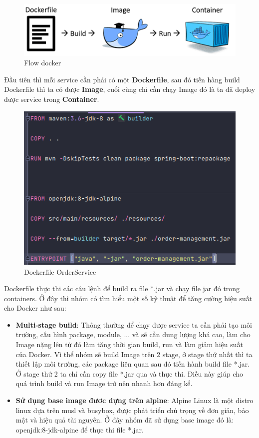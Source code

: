 		  
		  \begin{figure}[H]
		  	\centering
		  	\includegraphics[width=0.8\linewidth]{Images/flowDocker}
		  	\linebreak
		  	\caption{Flow docker}
		  \end{figure}
		  
		  Đầu tiên thì mỗi service cần phải có một \textbf{Dockerfile}, sau đó tiến hàng build Dockerfile thì ta có được \textbf{Image}, cuối cùng chỉ cần chạy Image đó là ta đã deploy được service trong \textbf{Container}.
		  
		  \begin{figure}[H]
		  	\centering
		  	\includegraphics[width=0.7\linewidth]{Images/DockerfileOrderService}
		  	\linebreak
		  	\caption{Dockerfile OrderService}
		  \end{figure}
		  
		  Dockerfile thực thi các câu lệnh để build ra file *.jar và chạy file jar đó trong containers. Ở đây thì nhóm có tìm hiểu một số kỹ thuật để tăng cường hiệu suất cho Docker như sau:
		  
		  \begin{itemize}
		  	\item \textbf{Multi-stage build}: Thông thường để chạy được service ta cần phải tạo môi trường, cấu hình package, module, ... và sẽ cần dung lượng khá cao, làm cho Image nặng lên từ đó làm tăng thời gian build, run và làm giảm hiệu suất của Docker. Vì thể nhóm sẽ build Image trên 2 stage, ở stage thứ nhất thì ta thiết lập môi trường, các package liên quan sau đó tiến hành build file *.jar. Ở stage thứ 2 ta chỉ cần copy file *.jar qua và thực thi. Điều này giúp cho quá trình build và run Image trở nên nhanh hơn đáng kể.
		  	\item \textbf{Sử dụng base image đươc dựng trên alpine}: Alpine Linux là một distro linux dựa trên musl và busybox, được phát triển chú trọng về đơn giản, bảo mật và hiệu quả tài nguyên. Ở đây nhóm đã sử dụng base image đó là: openjdk:8-jdk-alpine để thực thi file *.jar.
		  \end{itemize}
		  
